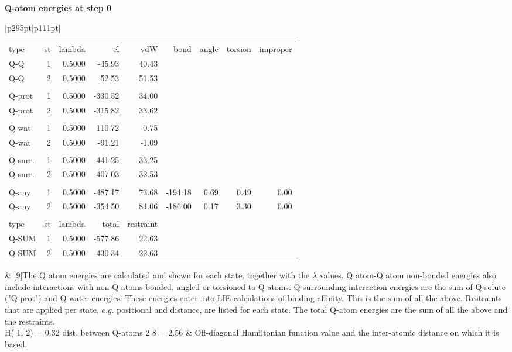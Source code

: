\documentclass[a4paper,10pt]{article}
\begin{document}
\normalsize
\textbf{Q-atom energies at step 0}
\tiny
\vspace{-1\baselineskip}
\begin{longtable}{|p{295pt}|p{111pt}|}
\hline \begin{tabular}{lrrrrrrrr}type & st & lambda & el & vdW & bond & angle & torsion & improper\\Q-Q & 1 & 0.5000 & -45.93 & 40.43&&&&\\Q-Q & 2 & 0.5000 & 52.53 & 51.53 &&&&\\&&&&&&&&\\Q-prot & 1 & 0.5000 & -330.52 & 34.00&&&&\\Q-prot & 2 &0.5000 & -315.82 & 33.62 &&&&\\&&&&&&&&\\Q-wat & 1 & 0.5000 & -110.72 & -0.75&&&&\\Q-wat & 2 & 0.5000 & -91.21 & -1.09 &&&&\\&&&&&&&&\\Q-surr. & 1 & 0.5000 & -441.25 & 33.25&&&&\\Q-surr. & 2 & 0.5000 & -407.03 & 32.53 &&&&\\&&&&&&&&\\Q-any & 1 &0.5000 & -487.17 & 73.68 & -194.18 & 6.69 & 0.49 & 0.00\\Q-any & 2 & 0.5000 & -354.50 & 84.06 & -186.00 & 0.17 & 3.30 & 0.00 \\&&&&&&&&\\type & st & lambda & total & restraint\\Q-SUM & 1 & 0.5000 & -577.86 & 22.63&&&&\\Q-SUM & 2 & 0.5000 & -430.34 & 22.63&&&&\end{tabular} & [9\baselineskip]{The Q atom energies are calculated and shown for each state, together with the $\lambda$ values. Q atom-Q atom non-bonded energies also include interactions with non-Q atoms bonded, angled or torsioned to Q atoms. Q-surrounding interaction energies are the sum of Q-solute ("Q-prot") and Q-water energies. These energies enter into LIE calculations of binding affinity. This is the sum of all the above. Restraints that are applied per state, $e.g.$ positional and distance, are listed for each state. The total Q-atom energies are the sum of all the above and the restraints.}\\
\hline H( 1, 2) =  0.32 dist. between Q-atoms  2  8 =  2.56 & Off-diagonal Hamiltonian function value and the inter-atomic distance on which it is based.\\
\hline
\end{longtable}
\end{document}
